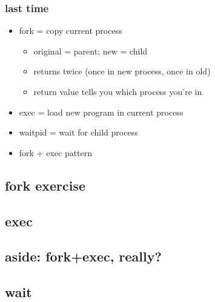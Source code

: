 \date{}
\title{}
\date{}

\begin{frame}
    \titlepage
\end{frame}



\usetikzlibrary{patterns}

\begin{frame}
\frametitle{last time}
\begin{itemize}
\item fork = copy current process
    \begin{itemize}
    \item original = parent; new = child
    \item returns twice (once in new process, once in old)
    \item return value tells you which process you're in
    \end{itemize}
\item exec = load new program in current process
\item waitpid = wait for child process
\item fork + exec pattern
\end{itemize}
\end{frame}





\subsection{fork exercise}




\subsection{exec}






\subsection{aside: fork+exec, really?}



\subsection{wait}


